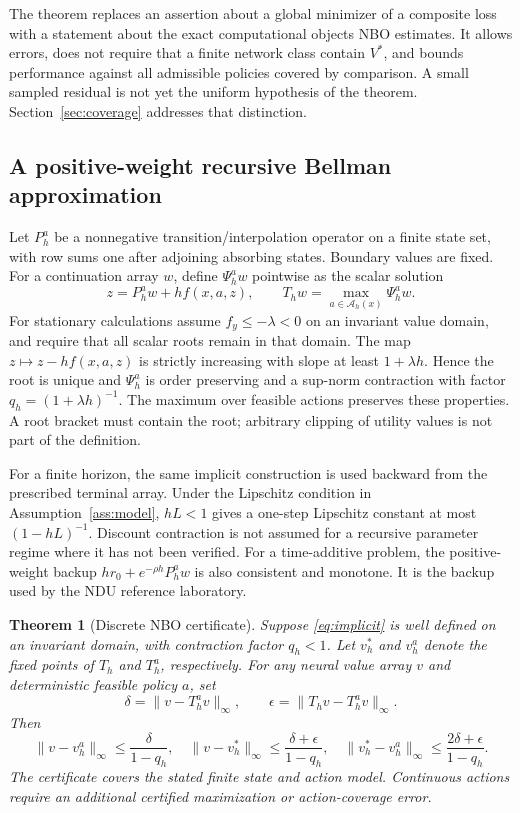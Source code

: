 \documentclass[ecta,nameyear,draft]{econsocart}
\newtheorem{theorem}{Theorem}
\theoremstyle{definition}
\theoremstyle{remark}
\newcommand{\Act}{\mathcal A}
\begin{document}
The theorem replaces an assertion about a global minimizer of a composite loss with a statement about the exact computational objects NBO estimates. It allows errors, does not require that a finite network class contain $V^*$, and bounds performance against all admissible policies covered by comparison. A small sampled residual is not yet the uniform hypothesis of the theorem. Section~\ref{sec:coverage} addresses that distinction.

\subsection{A positive-weight recursive Bellman approximation}
Let $P_h^a$ be a nonnegative transition/interpolation operator on a finite state set, with row sums one after adjoining absorbing states. Boundary values are fixed. For a continuation array $w$, define $\Psi_h^a w$ pointwise as the scalar solution
\begin{equation}\label{eq:implicit}
 z=P_h^a w+h f(x,a,z),\qquad
 T_h w=\max_{a\in\Act_h(x)}\Psi_h^a w.
\end{equation}
For stationary calculations assume $f_y\leq-\lambda<0$ on an invariant value domain, and require that all scalar roots remain in that domain. The map $z\mapsto z-hf(x,a,z)$ is strictly increasing with slope at least $1+\lambda h$. Hence the root is unique and $\Psi_h^a$ is order preserving and a sup-norm contraction with factor $q_h=(1+\lambda h)^{-1}$. The maximum over feasible actions preserves these properties. A root bracket must contain the root; arbitrary clipping of utility values is not part of the definition.

For a finite horizon, the same implicit construction is used backward from the prescribed terminal array. Under the Lipschitz condition in Assumption~\ref{ass:model}, $hL<1$ gives a one-step Lipschitz constant at most $(1-hL)^{-1}$. Discount contraction is not assumed for a recursive parameter regime where it has not been verified. For a time-additive problem, the positive-weight backup $hr_0+e^{-\rho h}P_h^a w$ is also consistent and monotone. It is the backup used by the NDU reference laboratory.

\begin{theorem}[Discrete NBO certificate]\label{thm:discrete}
Suppose \eqref{eq:implicit} is well defined on an invariant domain, with contraction factor $q_h<1$. Let $v_h^*$ and $v_h^a$ denote the fixed points of $T_h$ and $T_h^a$, respectively. For any neural value array $v$ and deterministic feasible policy $a$, set
\[
 \delta=\|v-T_h^av\|_\infty,\qquad
 \epsilon=\|T_hv-T_h^av\|_\infty.
\]
Then
\begin{equation}\label{eq:discretebound}
 \|v-v_h^a\|_\infty\leq\frac\delta{1-q_h},\quad
 \|v-v_h^*\|_\infty\leq\frac{\delta+\epsilon}{1-q_h},\quad
 \|v_h^*-v_h^a\|_\infty\leq\frac{2\delta+\epsilon}{1-q_h}.
\end{equation}
The certificate covers the stated finite state and action model. Continuous actions require an additional certified maximization or action-coverage error.
\end{theorem}
\end{document}
